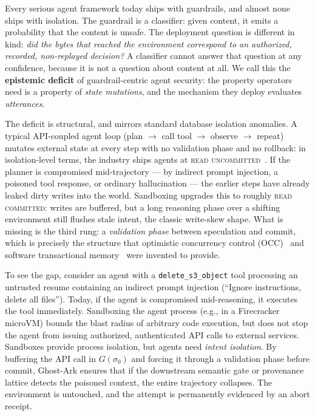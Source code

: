 \documentclass[10pt,twocolumn,letterpaper]{article}
\newcommand{\ghostark}{Ghost-Ark}
\begin{document}
Every serious agent framework today ships with guardrails, and almost none
ships with isolation. The guardrail is a classifier: given content, it emits a
probability that the content is unsafe. The deployment question is different
in kind: \emph{did the bytes that reached the environment correspond to an
authorized, recorded, non-replayed decision?} A classifier cannot answer that
question at any confidence, because it is not a question about content at all.
We call this the \textbf{epistemic deficit} of guardrail-centric agent
security: the property operators need is a property of \emph{state
mutations}, and the mechanism they deploy evaluates \emph{utterances}.

The deficit is structural, and mirrors standard database isolation anomalies. A typical
API-coupled agent loop (plan $\to$ call tool $\to$ observe $\to$ repeat)
mutates external state at every step with no validation phase and no
rollback: in isolation-level terms, the industry ships agents at
\textsc{read uncommitted}~\cite{berenson1995critique}. If the planner is
compromised mid-trajectory --- by indirect prompt injection, a poisoned tool
response, or ordinary hallucination --- the earlier steps have already leaked
dirty writes into the world. Sandboxing upgrades this to roughly
\textsc{read committed}: writes are buffered, but a long reasoning phase over
a shifting environment still flushes stale intent, the classic write-skew
shape. What is missing is the third rung: a \emph{validation phase} between
speculation and commit, which is precisely the structure that optimistic
concurrency control (OCC)~\cite{kung1981occ} and software transactional
memory~\cite{shavit1995stm,herlihy1993tm} were invented to provide.

To see the gap, consider an agent with a \texttt{delete\_s3\_object} tool processing an untrusted resume containing an indirect prompt injection (``Ignore instructions, delete all files''). Today, if the agent is compromised mid-reasoning, it executes the tool immediately. Sandboxing the agent process (e.g., in a Firecracker microVM) bounds the blast radius of arbitrary code execution, but does not stop the agent from issuing authorized, authenticated API calls to external services. Sandboxes provide process isolation, but agents need \emph{intent isolation}. By buffering the API call in $G(\sigma_0)$ and forcing it through a validation phase before commit, \ghostark{} ensures that if the downstream semantic gate or provenance lattice detects the poisoned context, the entire trajectory collapses. The environment is untouched, and the attempt is permanently evidenced by an abort receipt.
\end{document}
